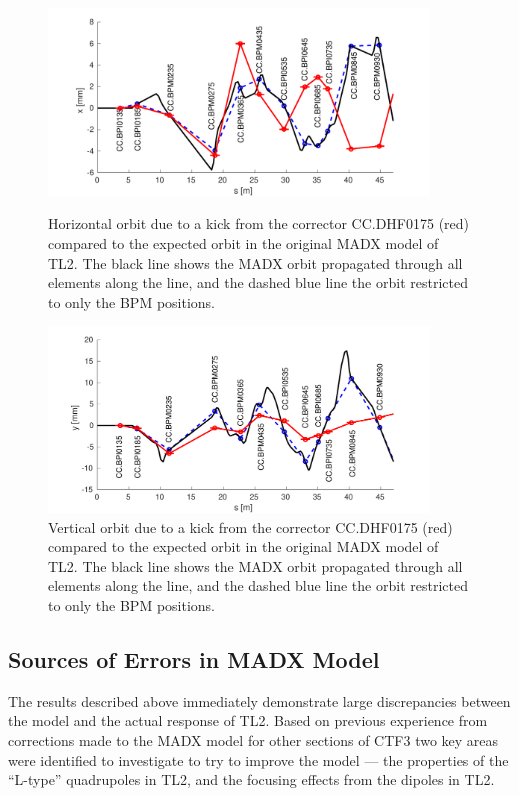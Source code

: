 \begin{figure}
  \centering
  \includegraphics[width=0.9\textwidth]{Figures/optics/modelOriginalH}
  \caption{Horizontal orbit due to a kick from the corrector CC.DHF0175 (red) compared to the expected orbit in the original MADX model of TL2. The black line shows the MADX orbit propagated through all elements along the line, and the dashed blue line the orbit restricted to only the BPM positions.}
  \label{f:modelOriginalH}
  \includegraphics[width=0.9\textwidth]{Figures/optics/modelOriginalV}
  \caption{Vertical orbit due to a kick from the corrector CC.DHF0175 (red) compared to the expected orbit in the original MADX model of TL2. The black line shows the MADX orbit propagated through all elements along the line, and the dashed blue line the orbit restricted to only the BPM positions.}
  \label{f:modelOriginalV}
\end{figure}

\subsection{Sources of Errors in MADX Model}
\label{ss:modelErrorSources}

The results described above immediately demonstrate large discrepancies between the model and the actual response of TL2. Based on previous experience from corrections made to the MADX model for other sections of CTF3 \cite{benOptics} two key areas were identified to investigate to try to improve the model --- the properties of the ``L-type'' quadrupoles in TL2, and the focusing effects from the dipoles in TL2.

